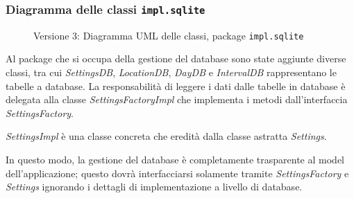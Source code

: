 \subsubsection{Diagramma delle classi \texttt{impl.sqlite}}
\vspace{0.5cm}
\begin{figure}[H]
    \centering
    \caption{Versione 3: Diagramma UML delle classi, package \texttt{impl.sqlite}}
    \label{fig:class_db_v_3}
\end{figure}

Al package che si occupa della gestione del database sono state aggiunte diverse classi, tra cui \textit{SettingsDB}, \textit{LocationDB}, \textit{DayDB} e \textit{IntervalDB}
rappresentano le tabelle a database. La responsabilità di leggere i dati dalle tabelle in database è delegata alla classe \textit{SettingsFactoryImpl} che implementa i metodi dall'interfaccia \textit{SettingsFactory}.

\textit{SettingsImpl} è una classe concreta che eredità dalla classe astratta \textit{Settings}.

In questo modo, la gestione del database è completamente trasparente al model dell'applicazione; questo dovrà interfacciarsi solamente tramite \textit{SettingsFactory} e \textit{Settings} ignorando i dettagli di implementazione a livello di database.